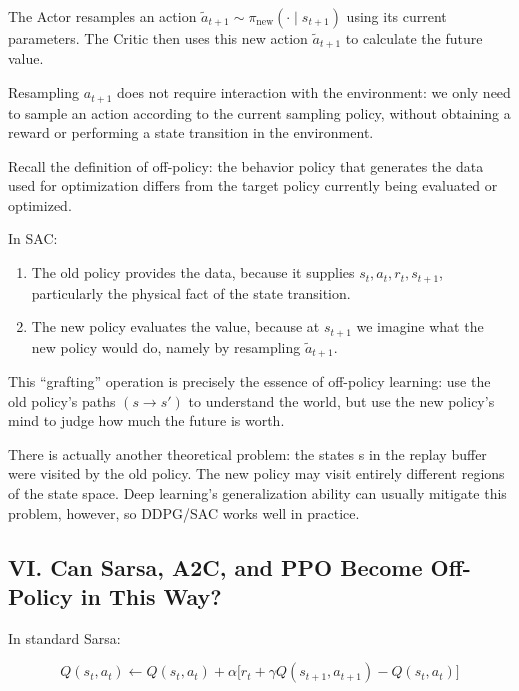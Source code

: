 The Actor resamples an action \(\tilde{a}_{t+1}\sim\pi_{\mathrm{new}}(\cdot\mid s_{t+1})\) using its current parameters. The Critic then uses this new action \(\tilde{a}_{t+1}\) to calculate the future value.

Resampling \(a_{t+1}\) does not require interaction with the environment: we only need to sample an action according to the current sampling policy, without obtaining a reward or performing a state transition in the environment.

Recall the definition of off-policy: the behavior policy that generates the data used for optimization differs from the target policy currently being evaluated or optimized.

In SAC:

\begin{enumerate}
\def\labelenumi{\arabic{enumi}.}
\tightlist
\item
  The old policy provides the data, because it supplies \(s_t,a_t,r_t,s_{t+1}\), particularly the physical fact of the state transition.
\item
  The new policy evaluates the value, because at \(s_{t+1}\) we imagine what the new policy would do, namely by resampling \(\tilde{a}_{t+1}\).
\end{enumerate}

This ``grafting'' operation is precisely the essence of off-policy learning: use the old policy's paths \((s\to s')\) to understand the world, but use the new policy's mind to judge how much the future is worth.

There is actually another theoretical problem: the states s in the replay buffer were visited by the old policy. The new policy may visit entirely different regions of the state space. Deep learning's generalization ability can usually mitigate this problem, however, so DDPG/SAC works well in practice.

\hypertarget{vi.-can-sarsa-a2c-and-ppo-become-off-policy-in-this-way}{%
\subsection{VI. Can Sarsa, A2C, and PPO Become Off-Policy in This Way?}\label{vi.-can-sarsa-a2c-and-ppo-become-off-policy-in-this-way}}

In standard Sarsa:

\[
Q(s_t,a_t)
\leftarrow
Q(s_t,a_t)
+
\alpha
\bigl[
r_t
+
\gamma Q(s_{t+1},a_{t+1})
-
Q(s_t,a_t)
\bigr]
\]

